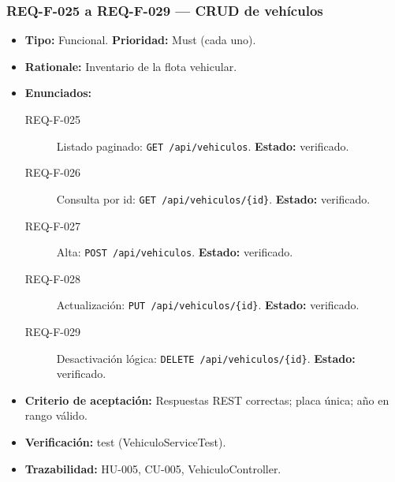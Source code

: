 \documentclass[12pt,a4paper]{article}
\begin{document}
\subsubsection{REQ-F-025 a REQ-F-029 --- CRUD de vehículos}
\begin{itemize}
  \item \textbf{Tipo:} Funcional. \textbf{Prioridad:} Must (cada uno).
  \item \textbf{Rationale:} Inventario de la flota vehicular.
  \item \textbf{Enunciados:}
    \begin{description}
      \item[REQ-F-025] Listado paginado: \texttt{GET /api/vehiculos}. \textbf{Estado:} verificado.
      \item[REQ-F-026] Consulta por id: \texttt{GET /api/vehiculos/\{id\}}. \textbf{Estado:} verificado.
      \item[REQ-F-027] Alta: \texttt{POST /api/vehiculos}. \textbf{Estado:} verificado.
      \item[REQ-F-028] Actualización: \texttt{PUT /api/vehiculos/\{id\}}. \textbf{Estado:} verificado.
      \item[REQ-F-029] Desactivación lógica: \texttt{DELETE /api/vehiculos/\{id\}}. \textbf{Estado:} verificado.
    \end{description}
  \item \textbf{Criterio de aceptación:} Respuestas REST correctas; placa única; año en rango válido.
  \item \textbf{Verificación:} test (VehiculoServiceTest).
  \item \textbf{Trazabilidad:} HU-005, CU-005, VehiculoController.
\end{itemize}

\end{document}
